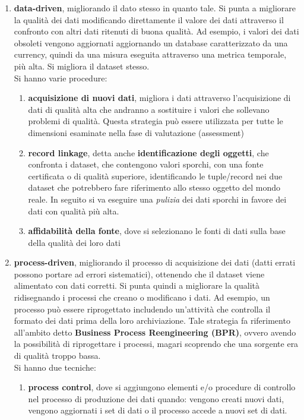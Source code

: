 \begin{enumerate}
    \item \textbf{data-driven}, migliorando il dato stesso in quanto tale. Si punta a migliorare la qualità dei dati modificando direttamente il valore dei dati attraverso il confronto con altri dati ritenuti di buona qualità. Ad esempio, i valori dei dati obsoleti vengono aggiornati aggiornando un database caratterizzato da una currency, quindi da una misura eseguita attraverso una metrica temporale, più alta. Si migliora il dataset stesso.\\ Si hanno varie procedure:
        \begin{enumerate}
            \item \textbf{acquisizione di nuovi dati}, migliora i dati attraverso l'acquisizione di dati di qualità alta che andranno a sostituire i valori che sollevano problemi di qualità. Questa strategia può essere utilizzata per tutte le dimensioni esaminate nella fase di valutazione (assessment)
            \item \textbf{record linkage}, detta anche \textbf{identificazione degli oggetti}, che confronta i dataset, che contengono valori sporchi, con una fonte certificata o di qualità superiore, identificando le tuple/record nei due dataset che potrebbero fare riferimento allo stesso oggetto del mondo reale. In seguito si va eseguire una \textit{pulizia} dei dati sporchi in favore dei dati con qualità più alta.
            \item \textbf{affidabilità della fonte}, dove si selezionano le fonti di dati sulla base della qualità dei loro dati
        \end{enumerate}
    \item \textbf{process-driven}, migliorando il processo di acquisizione dei dati (datti errati possono portare ad errori sistematici), ottenendo che il dataset viene alimentato con dati corretti. Si punta quindi a migliorare la qualità ridisegnando i processi che creano o modificano i dati. Ad esempio, un processo può essere riprogettato includendo un'attività che controlla il formato dei dati prima della loro archiviazione. Tale strategia fa riferimento all'ambito detto \textbf{Business Process Reengineering (BPR)}, ovvero avendo la possibilità di riprogettare i processi, magari scoprendo che una sorgente era di qualità troppo bassa.\\
    Si hanno due tecniche:
        \begin{enumerate}
        \item \textbf{process control}, dove si aggiungono elementi e/o procedure di controllo nel processo di produzione dei dati quando: vengono creati nuovi dati, vengono aggiornati i set di dati o il processo accede a nuovi set di dati.

\end{enumerate}
\end{enumerate}
